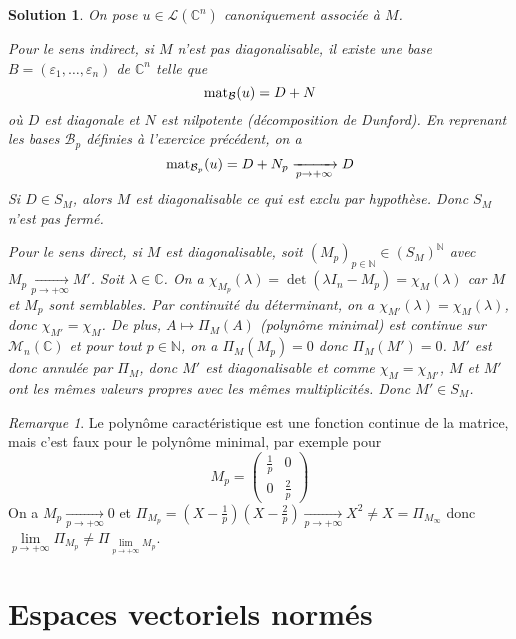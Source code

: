 \documentclass[12pt]{article}
\newtheorem{solution}{Solution}[section]
\theoremstyle{remark}
\newtheorem{remark}{Remarque}
\newcommand{\C}{\mathbb{C}} \newcommand{\Q}{\mathbb{Q}}
\newcommand{\N}{\mathbb{N}} \newcommand{\Z}{\mathbb{Z}}
\newcommand{\M}{\mathcal{M}} \renewcommand{\L}{\mathcal{L}}
\begin{document}
\begin{solution}
	On pose $u\in\L(\C^{n})$ canoniquement associée à $M$. 

	Pour le sens indirect, si $M$ n'est pas diagonalisable, il existe une base $B=(\varepsilon_{1},\dots,\varepsilon_{n})$ de $\C^{n}$ telle que 
	$$\operatorname{mat}\limits_{\mathcal{B}}(u)=D+N$$
	où $D$ est diagonale et $N$ est nilpotente (décomposition de Dunford). En reprenant les bases $\mathcal{B}_{p}$ définies à l'exercice précédent, on a
	$$\operatorname{mat}\limits_{\mathcal{B}_{p}}(u)=D+N_{p}\xrightarrow[p\to+\infty]{}D$$
	Si $D\in S_{M}$, alors $M$ est diagonalisable ce qui est exclu par hypothèse. Donc $S_{M}$ n'est pas fermé.

	Pour le sens direct, si $M$ est diagonalisable, soit $(M_{p})_{p\in\N}\in(S_{M})^{\N}$ avec $M_{p}\xrightarrow[p\to+\infty]{}M'$. Soit $\lambda\in\C$. On a $\chi_{M_{p}}(\lambda)=\det(\lambda I_{n}-M_{p})=\chi_{M}(\lambda)$ car $M$ et $M_{p}$ sont semblables. Par continuité du déterminant, on a $\chi_{M'}(\lambda)=\chi_{M}(\lambda)$, donc $\chi_{M'}=\chi_{M}$. De plus, $A\mapsto\Pi_{M}(A)$ (polynôme minimal) est continue sur $\M_{n}(\C)$ et pour tout $p\in\N$, on a $\Pi_{M}(M_{p})=0$ donc $\Pi_{M}(M')=0$. $M'$ est donc annulée par $\Pi_{M}$, donc $M'$ est diagonalisable et comme $\chi_{M}=\chi_{M'}$, $M$ et $M'$ ont les mêmes valeurs propres avec les mêmes multiplicités. Donc $M'\in S_{M}$.
\end{solution}

\begin{remark}
	Le polynôme caractéristique est une fonction continue de la matrice, mais c'est faux pour le polynôme minimal, par exemple pour 
	$$M_{p}=\begin{pmatrix}
		\frac{1}{p} &0\\
		0 & \frac{2}{p}
	\end{pmatrix}$$
	On a $M_{p}\xrightarrow[p\to+\infty]{}0$ et $\Pi_{M_{p}}=(X-\frac{1}{p})(X-\frac{2}{p})\xrightarrow[p\to+\infty]{} X^{2}\neq X=\Pi_{M_{\infty}}$ donc $\lim\limits_{p\to+\infty}\Pi_{M_p}\neq\Pi_{\lim\limits_{p\to+\infty}M_{p}}$.
\end{remark}

\cleardoublepage
\section{Espaces vectoriels normés}
\end{document}
